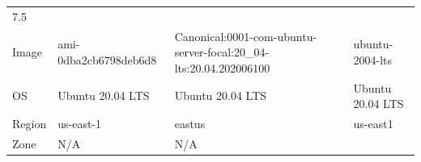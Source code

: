 \begin{tabular}[]{@{}llll@{}}
\begin{minipage}[t]{0.12\columnwidth}
7.5\strut
\end{minipage}\tabularnewline
\begin{minipage}[t]{0.13\columnwidth}\raggedright
Image\strut
\end{minipage} & \begin{minipage}[t]{0.17\columnwidth}\raggedright
ami-0dba2cb6798deb6d8\strut
\end{minipage} & \begin{minipage}[t]{0.47\columnwidth}\raggedright
Canonical:0001-com-ubuntu-server-focal:20\_04-lts:20.04.202006100\strut
\end{minipage} & \begin{minipage}[t]{0.12\columnwidth}\raggedright
ubuntu-2004-lts\strut
\end{minipage}\tabularnewline
\begin{minipage}[t]{0.13\columnwidth}\raggedright
OS\strut
\end{minipage} & \begin{minipage}[t]{0.17\columnwidth}\raggedright
Ubuntu 20.04 LTS\strut
\end{minipage} & \begin{minipage}[t]{0.47\columnwidth}\raggedright
Ubuntu 20.04 LTS\strut
\end{minipage} & \begin{minipage}[t]{0.12\columnwidth}\raggedright
Ubuntu 20.04 LTS\strut
\end{minipage}\tabularnewline
\begin{minipage}[t]{0.13\columnwidth}\raggedright
Region\strut
\end{minipage} & \begin{minipage}[t]{0.17\columnwidth}\raggedright
us-east-1\strut
\end{minipage} & \begin{minipage}[t]{0.47\columnwidth}\raggedright
eastus\strut
\end{minipage} & \begin{minipage}[t]{0.12\columnwidth}\raggedright
us-east1\strut
\end{minipage}\tabularnewline
\begin{minipage}[t]{0.13\columnwidth}\raggedright
Zone\strut
\end{minipage} & \begin{minipage}[t]{0.17\columnwidth}\raggedright
N/A\strut
\end{minipage} & \begin{minipage}[t]{0.47\columnwidth}\raggedright
N/A\strut
\end{minipage} & \begin{minipage}[t]{0.12\columnwidth}\raggedright

\end{minipage}
\end{tabular}
